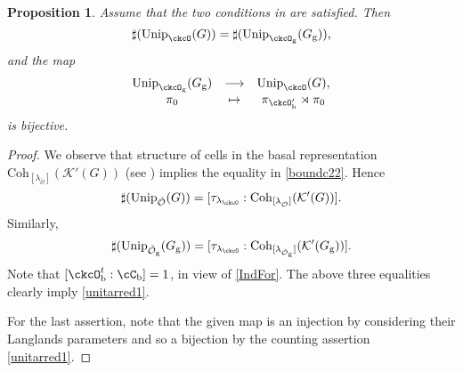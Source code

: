 \documentclass[12pt,a4paper]{amsart}
\newcommand{\CK}{{\mathcal {K}}}
\newcommand{\CO}{{\mathcal {O}}}
\newcommand{\be}{\begin {equation}}
\newcommand{\ee}{\end {equation}}
\numberwithin{equation}{section}
\newtheorem{prop}[thm]{Proposition}
\theoremstyle{remark}
\def\cf{\emph{cf.} }
\def\Unip{\mathrm{Unip}}
\def\lamck{\lambda_\ckcO}
\def\Coh{\mathrm{Coh}}
\def\ckcOpb{\ckcO'_{\mathrm b}}
\def\Gg{G_{\mathrm g}}
\begin{document}
\begin{prop}
  Assume that the two conditions in  are satisfied.
  Then
  \begin{equation}\label{unitarred1}
    \sharp(\Unip_{\ckcO}(G)) =
    \sharp(\Unip_{\ckcO_{\mathrm g}}(\Gg)),
  \end{equation}
  and
  the map
  \[
    \begin{array}{ccc}
      \Unip_{\ckcO_{\mathrm g}}(\Gg)&\longrightarrow &\Unip_{\ckcO}(G),\\
      \pi_{0}& \mapsto & \pi_{\ckcOpb}\rtimes \pi_{0} \\
    \end{array}
  \]
  is bijective. %
\end{prop}

\begin{proof}
  We observe that structure of cells in the basal representation
  $\Coh_{[\lambda_{\check \CO}]}(\CK'(G))$ (see \cite[Theorem 5]{Bo}) implies
  the equality in \eqref{boundc22}. Hence
  \[
    \sharp(\Unip_{\check \CO}(G)) =[\tau_{\lamck}: \Coh_{[\lambda_{\check \CO}]}(\CK'(G))].
  \]
  Similarly,
  \[
    \sharp(\Unip_{\check \CO_\mathrm g}(G_\mathrm g)) = [\tau_{\lamck}: \Coh_{[\lambda_{\check \CO_\mathrm g}]}(\CK'(G_\mathrm g))].
  \]
  Note that $[\ckcO_{\mathrm b}^{t}:\cC_{\mathrm b}]=1$, in view of
  \eqref{IndFor}. The above three equalities clearly imply \eqref{unitarred1}.
 
  For the last assertion, note that the given map is an injection by considering
  their {\color{red}Langlands parameters } %
  and so a bijection by the counting assertion \eqref{unitarred1}.
\end{proof}
\end{document}
